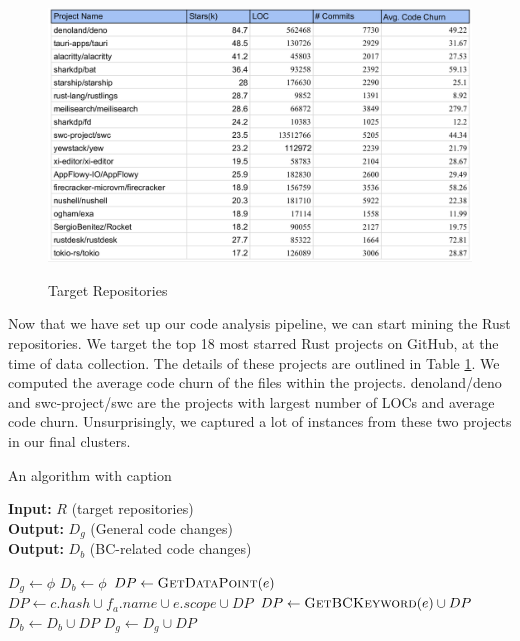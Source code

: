 \begin{figure}[h]
\centering
\includegraphics[width=1\textwidth]{repos.png}
\label{f3}
\caption{Target Repositories}
\end{figure}

Now that we have set up our code analysis pipeline, we can start mining the Rust repositories. We target the top 18 most starred Rust projects on GitHub, at the time of data collection. The details of these projects are outlined in Table \ref{f3}. We computed the average code churn of the files within the projects. denoland/deno and swc-project/swc are the projects with largest number of LOCs and average code churn. Unsurprisingly, we captured a lot of instances from these two projects in our final clusters.

\begin{algorithm}
\caption{An algorithm with caption}\label{alg:cap}
\hspace*{2mm} \textbf{Input:} $R$ (target repositories)  \\
\hspace*{2mm} \textbf{Output:} $D_g$ (General code changes) \\
\hspace*{2mm} \textbf{Output:} $D_b$ (BC-related code changes)
\begin{algorithmic}
\State $D_g \leftarrow \phi$
\State $D_b \leftarrow \phi$
                    \State $DP \leftarrow \textsc{GetDataPoint}(e)$
                    \State $DP \leftarrow c.hash \cup f_a.name \cup e.scope \cup DP $
                        \State $DP \leftarrow \textsc{GetBCKeyword}(e) \cup DP $
                        \State $D_b \leftarrow D_b \cup DP$
                    \Else
                        \State $D_g \leftarrow D_g \cup DP$
                    \EndIf
                \EndFor
            \EndFor
        \EndIf
    \EndFor
\EndFor
\end{algorithmic}
\end{algorithm}

